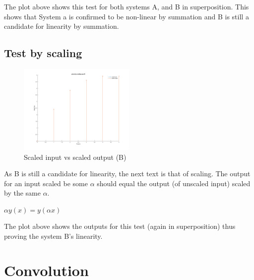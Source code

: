 \documentclass[a4paper,11pt]{article}
\begin{document}
The plot above shows this test for both systems A, and B in superposition.
This shows that System a is confirmed to be non-linear by summation and B is still a candidate for linearity by summation. 

\newpage
		\subsection{Test by scaling}
			\begin{figure}[h]
			 \begin{center}
			  \includegraphics[width=0.5\textwidth]{2c}
			  \caption{Scaled input vs scaled output (B)}
			 \end{center}
			\end{figure}
			As B is still a candidate for linearity, the next text is that of 			scaling. The output for an input scaled be some $\alpha$ should 				equal the output (of unscaled input) scaled by the same $\alpha$.
			\begin{center}
			$\alpha y(x) = y(\alpha x)$
			\end{center}
			The plot above shows the outputs for this test (again in 						superposition) thus proving the system B's linearity.

	\section{Convolution}
\end{document}
